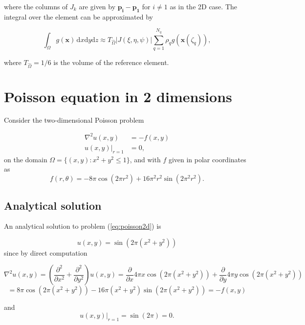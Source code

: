 \documentclass[paper=a4, fontsize=11pt]{scrartcl} %
\begin{document}
where the columns of $J_k$ are given by $\mathbf{p_i}-\mathbf{p_1}$ for $i\neq1$ as in the 2D case. The integral over the element can be approximated by

\[ \int_{\Omega} \! g(\mathbf{x}) \, \mathrm{d}x\mathrm{d}y\mathrm{d}z  \approx T_{\hat{\Omega}} |J(\xi,\eta,\psi)| \sum_{q=1}^{N_q} \rho_{q}g(\mathbf{x}(\zeta_q)),
\]

where $T_{\hat{\Omega}}=1/6$ is the volume of the reference element.

\section{Poisson equation in 2 dimensions}

Consider the two-dimensional Poisson problem

\begin{equation}
\begin{aligned}
\nabla^2u(x,y) 	&= -f(x,y) \\
u(x,y)|_{r=1} 	&= 0,
\end{aligned}
\label{eq:poisson2d}
\end{equation}
on the domain $\Omega = \{(x,y) : x^2+y^2\leq 1\}$, and with $f$ given in polar coordinates as
\[ f(r,\theta)= -8\pi \cos(2\pi r^2)+16\pi^2r^2\sin(2\pi^2 r^2).\]

\subsection{Analytical solution}
An analytical solution to problem (\ref{eq:poisson2d}) is 

\begin{equation}
u(x,y)=\sin\left(2\pi(x^2+y^2)\right)
\label{eq:poisson2danal}
\end{equation}
since by direct computation

\[\nabla^2u(x,y) = \left( \frac{\partial^2}{\partial x^2} + \frac{\partial^2}{\partial y^2} \right) u(x,y) = \frac{\partial}{\partial x} 4\pi x\cos\left(2\pi(x^2+y^2)\right) + \frac{\partial}{\partial y} 4\pi y\cos\left(2\pi(x^2+y^2)\right)
\]\[= 8\pi\cos\left(2\pi(x^2+y^2)\right) -16\pi(x^2+y^2)\sin\left(2\pi(x^2+y^2)\right) = -f(x,y)\]

and \[u(x,y)|_{r=1}=\sin(2\pi)=0.\]
\end{document}
